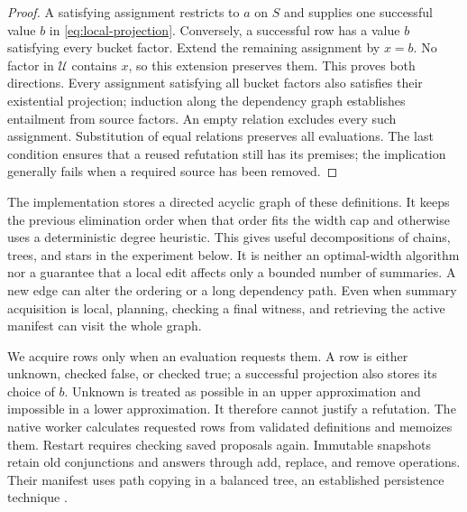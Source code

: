 \documentclass[11pt,a4paper]{article}
\numberwithin{equation}{section}
\theoremstyle{plain}
\theoremstyle{definition}
\theoremstyle{remark}
\begin{document}
\begin{proof}
A satisfying assignment restricts to $a$ on $S$ and supplies one successful value $b$ in \eqref{eq:local-projection}. Conversely, a successful row has a value $b$ satisfying every bucket factor. Extend the remaining assignment by $x=b$. No factor in $\mathcal U$ contains $x$, so this extension preserves them. This proves both directions. Every assignment satisfying all bucket factors also satisfies their existential projection; induction along the dependency graph establishes entailment from source factors. An empty relation excludes every such assignment. Substitution of equal relations preserves all evaluations. The last condition ensures that a reused refutation still has its premises; the implication generally fails when a required source has been removed.
\end{proof}

The implementation stores a directed acyclic graph of these definitions. It keeps the previous elimination order when that order fits the width cap and otherwise uses a deterministic degree heuristic. This gives useful decompositions of chains, trees, and stars in the experiment below. It is neither an optimal-width algorithm nor a guarantee that a local edit affects only a bounded number of summaries. A new edge can alter the ordering or a long dependency path. Even when summary acquisition is local, planning, checking a final witness, and retrieving the active manifest can visit the whole graph.

We acquire rows only when an evaluation requests them. A row is either unknown, checked false, or checked true; a successful projection also stores its choice of $b$. Unknown is treated as possible in an upper approximation and impossible in a lower approximation. It therefore cannot justify a refutation. The native worker calculates requested rows from validated definitions and memoizes them. Restart requires checking saved proposals again. Immutable snapshots retain old conjunctions and answers through add, replace, and remove operations. Their manifest uses path copying in a balanced tree, an established persistence technique \citep{driscoll1989persistent}.
\end{document}
